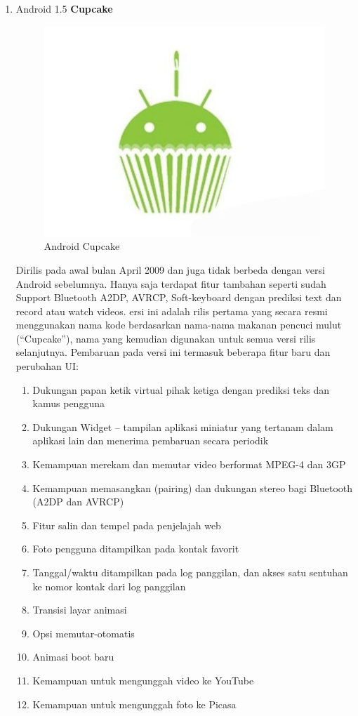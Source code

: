 \begin{enumerate}
\item Android 1.5 \textbf{Cupcake}\\
\begin{figure}[!htbp]
    \centering
    \includegraphics[scale = 0.3]{pictures/android-cupcake.jpg}
    \caption{Android Cupcake}
    \label{}
\end{figure}

Dirilis pada awal bulan April 2009 dan juga tidak berbeda dengan versi Android sebelumnya. Hanya saja terdapat fitur tambahan seperti sudah Support Bluetooth A2DP, AVRCP, Soft-keyboard dengan prediksi text dan record atau watch videos. ersi ini adalah rilis pertama yang secara resmi menggunakan nama kode berdasarkan nama-nama makanan pencuci mulut (“Cupcake”), nama yang kemudian digunakan untuk semua versi rilis selanjutnya. Pembaruan pada versi ini termasuk beberapa fitur baru dan perubahan UI:
\begin{enumerate}
    \item Dukungan papan ketik virtual pihak ketiga dengan prediksi teks dan kamus pengguna
    \item Dukungan Widget – tampilan aplikasi miniatur yang tertanam dalam aplikasi lain dan menerima pembaruan secara periodik
    \item Kemampuan merekam dan memutar video berformat MPEG-4 dan 3GP
    \item Kemampuan memasangkan (pairing) dan dukungan stereo bagi Bluetooth (A2DP dan AVRCP)
    \item Fitur salin dan tempel pada penjelajah web
    \item Foto pengguna ditampilkan pada kontak favorit
    \item Tanggal/waktu ditampilkan pada log panggilan, dan akses satu sentuhan ke nomor kontak dari log panggilan
    \item Transisi layar animasi
    \item Opsi memutar-otomatis
    \item Animasi boot baru
    \item Kemampuan untuk mengunggah video ke YouTube
    \item Kemampuan untuk mengunggah foto ke Picasa
\end{enumerate}



\end{enumerate}
